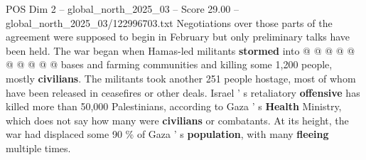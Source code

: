 \begin{textsample}{POS Dim 2 – global\_north\_2025\_03 – Score 29.00 – global\_north\_2025\_03/122996703.txt}
Negotiations over those parts of the agreement were supposed to begin in February but only preliminary talks have been held.
The war began when Hamas-led militants \textbf{stormed} into @ @ @ @ @ @ @ @ @ @ bases and farming communities and killing some 1,200 people, mostly \textbf{civilians}.
The militants took another 251 people hostage, most of whom have been released in ceasefires or other deals.
Israel ' s retaliatory \textbf{offensive} has killed more than 50,000 Palestinians, according to Gaza ' s \textbf{Health} Ministry, which does not say how many were \textbf{civilians} or combatants.
At its height, the war had displaced some 90 \% of Gaza ' s \textbf{population}, with many \textbf{fleeing} multiple times.

\end{textsample}
